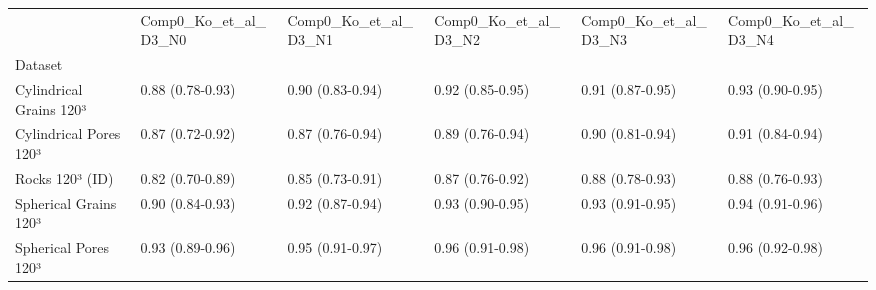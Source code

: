 \begin{tabular}{llllll}
\toprule
 & Comp0_Ko_et_al_D3_N0 & Comp0_Ko_et_al_D3_N1 & Comp0_Ko_et_al_D3_N2 & Comp0_Ko_et_al_D3_N3 & Comp0_Ko_et_al_D3_N4 \\
Dataset &  &  &  &  &  \\
\midrule
Cylindrical Grains 120³ & 0.88 (0.78-0.93) & 0.90 (0.83-0.94) & 0.92 (0.85-0.95) & 0.91 (0.87-0.95) & 0.93 (0.90-0.95) \\
Cylindrical Pores 120³ & 0.87 (0.72-0.92) & 0.87 (0.76-0.94) & 0.89 (0.76-0.94) & 0.90 (0.81-0.94) & 0.91 (0.84-0.94) \\
Rocks 120³ (ID) & 0.82 (0.70-0.89) & 0.85 (0.73-0.91) & 0.87 (0.76-0.92) & 0.88 (0.78-0.93) & 0.88 (0.76-0.93) \\
Spherical Grains 120³ & 0.90 (0.84-0.93) & 0.92 (0.87-0.94) & 0.93 (0.90-0.95) & 0.93 (0.91-0.95) & 0.94 (0.91-0.96) \\
Spherical Pores 120³ & 0.93 (0.89-0.96) & 0.95 (0.91-0.97) & 0.96 (0.91-0.98) & 0.96 (0.91-0.98) & 0.96 (0.92-0.98) \\
\bottomrule
\end{tabular}
